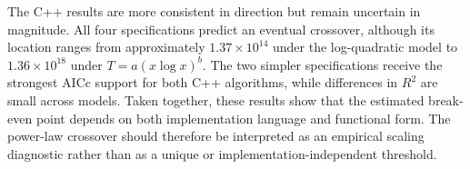 \documentclass[ijoc,blindrev]{informs3} %
\begin{document}
\begin{APPENDICES}
{The C++ results are more consistent in direction but remain uncertain in magnitude. All four specifications predict an eventual crossover, although its location ranges from approximately \(1.37\times10^{14}\) under the log-quadratic model to \(1.36\times10^{18}\) under \(T=a(x\log x)^b\). The two simpler specifications receive the strongest AICc support for both C++ algorithms, while differences in \(R^2\) are small across models. Taken together, these results show that the estimated break-even point depends on both implementation language and functional form. The power-law crossover should therefore be interpreted as an empirical scaling diagnostic rather than as a unique or implementation-independent threshold.

\begin{table}[!ht]
\color{blue}
\centering
\caption{Sensitivity of Python and C++ scaling and crossover estimates to functional form.}
\label{tab:crossover_sensitivity_combined}
\end{table}}
\end{APPENDICES}
\end{document}
